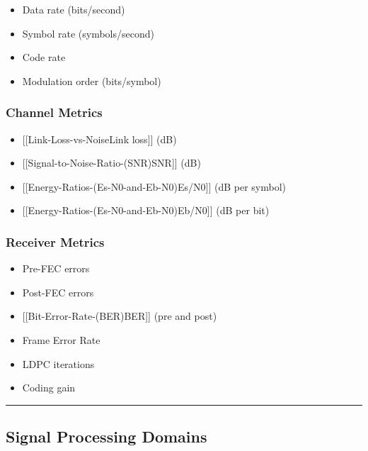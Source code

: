 \begin{itemize}
\tightlist
\item
  Data rate (bits/second)
\item
  Symbol rate (symbols/second)
\item
  Code rate
\item
  Modulation order (bits/symbol)
\end{itemize}

\subsubsection{Channel Metrics}\label{channel-metrics}

\begin{itemize}
\tightlist
\item
  {[}{[}Link-Loss-vs-Noise\textbar Link loss{]}{]} (dB)
\item
  {[}{[}Signal-to-Noise-Ratio-(SNR)\textbar SNR{]}{]} (dB)
\item
  {[}{[}Energy-Ratios-(Es-N0-and-Eb-N0)\textbar Es/N0{]}{]} (dB per
  symbol)
\item
  {[}{[}Energy-Ratios-(Es-N0-and-Eb-N0)\textbar Eb/N0{]}{]} (dB per bit)
\end{itemize}

\subsubsection{Receiver Metrics}\label{receiver-metrics}

\begin{itemize}
\tightlist
\item
  Pre-FEC errors
\item
  Post-FEC errors
\item
  {[}{[}Bit-Error-Rate-(BER)\textbar BER{]}{]} (pre and post)
\item
  Frame Error Rate
\item
  LDPC iterations
\item
  Coding gain
\end{itemize}

\begin{center}\rule{0.5\linewidth}{0.5pt}\end{center}

\subsection{Signal Processing Domains}\label{signal-processing-domains}

